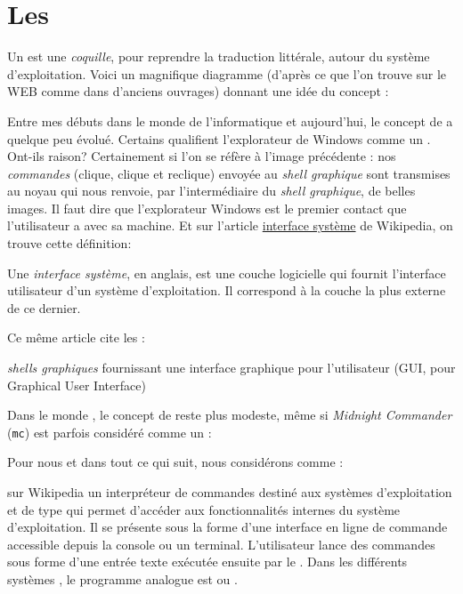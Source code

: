 
\section{Les \shells{}}
Un \shell{} est une \emph{coquille}, pour reprendre la traduction littérale, autour du système d'exploitation. Voici un magnifique diagramme (d'après ce que l'on trouve sur le WEB comme dans d'anciens ouvrages) donnant une idée du concept :


Entre mes débuts dans le monde de l'informatique et aujourd'hui, le concept de  \shell{} a quelque peu évolué. Certains qualifient l'explorateur de Windows comme un  \shell{}. Ont-ils raison? Certainement si l'on se réfère à l'image précédente : nos \emph{commandes} (clique, clique et reclique) envoyée au \emph{shell graphique} sont transmises au noyau qui nous renvoie, par l'intermédiaire du \emph{shell graphique}, de belles images. Il faut dire que l'explorateur Windows est le premier contact que l'utilisateur a avec sa machine.  Et sur l'article
\href{http://fr.wikipedia.org/wiki/Interface_syst%C3%A8me}{interface système} de Wikipedia, on trouve cette définition:

\begin{Quote}
Une \emph{interface système}, \shell{} en anglais, est une couche logicielle qui fournit l'interface utilisateur d'un système d'exploitation. Il correspond à la couche la plus externe de ce dernier.
\end{Quote}

Ce même article cite les :

\begin{Quote}
\emph{shells graphiques} fournissant une interface graphique pour l'utilisateur (GUI, pour Graphical User Interface)
\end{Quote}

Dans le monde \unix{}, le concept de  \shell{} reste plus modeste, même si \emph{Midnight Commander} (\texttt{mc}) est parfois considéré comme un \shell{}:


Pour nous et dans tout ce qui suit, nous considérons comme  \shell{} :

\begin{Quotebis}{\href{http://fr.wikipedia.org/wiki/Shell_Unix}{ \shell{} \unix{}} sur Wikipedia}
un interpréteur de commandes destiné aux systèmes d'exploitation \unix{} et de type \unix{} qui permet d'accéder aux fonctionnalités internes du système d'exploitation. Il se présente sous la forme d'une interface en ligne de commande accessible depuis la console ou un terminal. L'utilisateur lance des commandes sous forme d'une entrée texte exécutée ensuite par le  \shell{}. Dans les différents systèmes \windows, le programme analogue est  ou .
\end{Quotebis}

